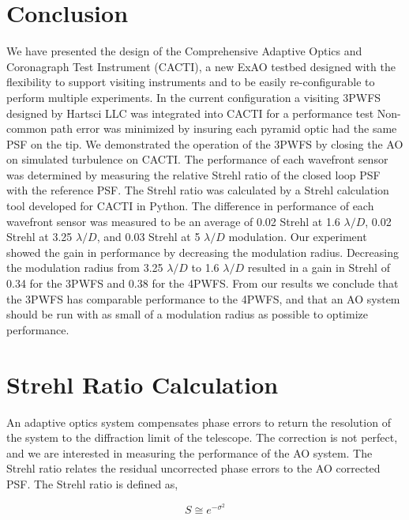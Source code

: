 \documentclass[12pt]{spieman}  %
\begin{document}
\begin{spacing}{2}
\section{Conclusion}

We have presented the design of the Comprehensive Adaptive Optics and Coronagraph Test Instrument (CACTI), a new ExAO testbed designed with the flexibility to support visiting instruments and to be easily re-configurable to perform multiple experiments. In the current configuration a visiting 3PWFS designed by Hartsci LLC was integrated into CACTI for a performance test Non-common path error was minimized by insuring each pyramid optic had the same PSF on the tip. We demonstrated the operation of the 3PWFS by closing the AO on simulated turbulence on CACTI. The performance of each wavefront sensor was determined by measuring the relative Strehl ratio of the closed loop PSF with the reference PSF. The Strehl ratio was calculated by a Strehl calculation tool developed for CACTI in Python. The difference in performance of each wavefront sensor was measured to be an average of 0.02 Strehl at 1.6 $\lambda/D$, 0.02 Strehl at 3.25 $\lambda/D$, and 0.03 Strehl at 5 $\lambda/D$ modulation. Our experiment showed the gain in performance by decreasing the modulation radius. Decreasing the modulation radius from 3.25 $\lambda/D$ to  1.6 $\lambda/D$ resulted in a gain in Strehl of 0.34 for the 3PWFS and 0.38 for the 4PWFS. From our results we conclude that the 3PWFS has comparable performance to the 4PWFS, and that an AO system should be run with as small of a modulation radius as possible to optimize performance. 






\appendix 
\section{Strehl Ratio Calculation} \label{strehlct}

An adaptive optics system compensates phase errors to return the resolution of the system to the diffraction limit of the telescope. The correction is not perfect, and we are interested in measuring the performance of the AO system. The Strehl ratio relates the residual uncorrected phase errors to the AO corrected PSF. The Strehl ratio is defined as, 

\begin{equation}
    S \cong e^{-\sigma^2}
\end{equation}


\end{spacing}
\end{document}
